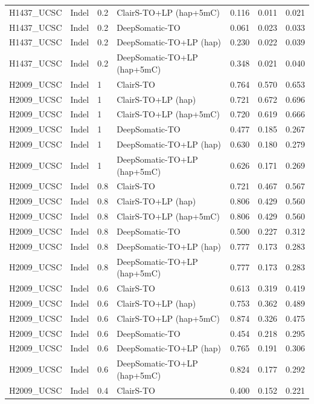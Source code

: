 \documentclass[pdflatex,sn-nature]{sn-jnl}
\begin{document}
{\begin{longtable}{@{}llllccc@{}}
  H1437\_UCSC & Indel & 0.2 & ClairS-TO+LP (hap+5mC) & 0.116 & 0.011 & 0.021 \\
  H1437\_UCSC & Indel & 0.2 & DeepSomatic-TO & 0.061 & 0.023 & 0.033 \\
  H1437\_UCSC & Indel & 0.2 & DeepSomatic-TO+LP (hap) & 0.230 & 0.022 & 0.039 \\
  H1437\_UCSC & Indel & 0.2 & DeepSomatic-TO+LP (hap+5mC) & 0.348 & 0.021 & 0.040 \\
  H2009\_UCSC & Indel & 1 & ClairS-TO & 0.764 & 0.570 & 0.653 \\
  H2009\_UCSC & Indel & 1 & ClairS-TO+LP (hap) & 0.721 & 0.672 & 0.696 \\
  H2009\_UCSC & Indel & 1 & ClairS-TO+LP (hap+5mC) & 0.720 & 0.619 & 0.666 \\
  H2009\_UCSC & Indel & 1 & DeepSomatic-TO & 0.477 & 0.185 & 0.267 \\
  H2009\_UCSC & Indel & 1 & DeepSomatic-TO+LP (hap) & 0.630 & 0.180 & 0.279 \\
  H2009\_UCSC & Indel & 1 & DeepSomatic-TO+LP (hap+5mC) & 0.626 & 0.171 & 0.269 \\
  H2009\_UCSC & Indel & 0.8 & ClairS-TO & 0.721 & 0.467 & 0.567 \\
  H2009\_UCSC & Indel & 0.8 & ClairS-TO+LP (hap) & 0.806 & 0.429 & 0.560 \\
  H2009\_UCSC & Indel & 0.8 & ClairS-TO+LP (hap+5mC) & 0.806 & 0.429 & 0.560 \\
  H2009\_UCSC & Indel & 0.8 & DeepSomatic-TO & 0.500 & 0.227 & 0.312 \\
  H2009\_UCSC & Indel & 0.8 & DeepSomatic-TO+LP (hap) & 0.777 & 0.173 & 0.283 \\
  H2009\_UCSC & Indel & 0.8 & DeepSomatic-TO+LP (hap+5mC) & 0.777 & 0.173 & 0.283 \\
  H2009\_UCSC & Indel & 0.6 & ClairS-TO & 0.613 & 0.319 & 0.419 \\
  H2009\_UCSC & Indel & 0.6 & ClairS-TO+LP (hap) & 0.753 & 0.362 & 0.489 \\
  H2009\_UCSC & Indel & 0.6 & ClairS-TO+LP (hap+5mC) & 0.874 & 0.326 & 0.475 \\
  H2009\_UCSC & Indel & 0.6 & DeepSomatic-TO & 0.454 & 0.218 & 0.295 \\
  H2009\_UCSC & Indel & 0.6 & DeepSomatic-TO+LP (hap) & 0.765 & 0.191 & 0.306 \\
  H2009\_UCSC & Indel & 0.6 & DeepSomatic-TO+LP (hap+5mC) & 0.824 & 0.177 & 0.292 \\
  H2009\_UCSC & Indel & 0.4 & ClairS-TO & 0.400 & 0.152 & 0.221 \\

\end{longtable}}
\end{document}
